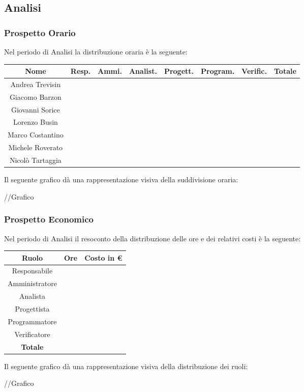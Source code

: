 \subsection{Analisi}

\subsubsection{Prospetto Orario}
Nel periodo di Analisi la distribuzione oraria è la seguente:

\begin{center}
\begin{tabular}{|c|c|c|c|c|c|c|c|}
\hline
\textbf{Nome} & \textbf{Resp.} & \textbf{Ammi.} & \textbf{Analist.} & \textbf{Progett.} & \textbf{Program.} & \textbf{Verific.} & \textbf{Totale} \\ \hline
Andrea Trevisin  & & & & & & &  \\ \hline
Giacomo Barzon   & & & & & & &  \\ \hline
Giovanni Sorice  & & & & & & &  \\ \hline
Lorenzo Busin    & & & & & & &  \\ \hline
Marco Costantino & & & & & & &  \\ \hline
Michele Roverato & & & & & & &  \\ \hline
Nicolò Tartaggia & & & & & & &  \\ \hline
\end{tabular}
\end{center}

Il seguente grafico dà una rappresentazione visiva della suddivisione oraria: \\
\begin{center}
//Grafico
\end{center}


\subsubsection{Prospetto Economico}
Nel periodo di Analisi il resoconto della distribuzione delle ore e dei relativi costi è la seguente:

\begin{center}
\begin{tabular}{|c|c|c|}
\hline
\textbf{Ruolo}  & \textbf{Ore} & \textbf{Costo in \euro} \\ \hline
Responsabile    &              &                     \\ \hline
Amministratore  &              &                     \\ \hline
Analista        &              &                     \\ \hline
Progettista     &              &                     \\ \hline
Programmatore   &              &                     \\ \hline
Verificatore    &              &                     \\ \hline
\textbf{Totale} & \textbf{}    & \textbf{}           \\ \hline
\end{tabular}
\end{center}

Il seguente grafico dà una rappresentazione visiva della distribuzione dei ruoli: \\
\begin{center}
//Grafico
\end{center}

\pagebreak
